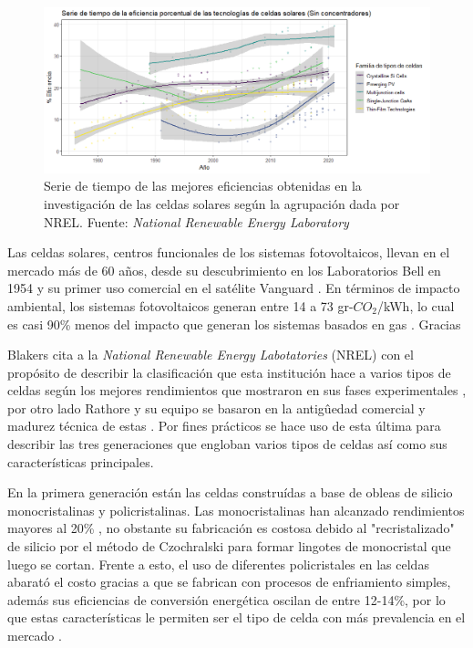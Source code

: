 \begin{figure}[h!]
    \includegraphics[scale=0.6]{img/SerieTiempo.png}
    \caption{Serie de tiempo de las mejores eficiencias obtenidas en la investigación de las celdas solares según la agrupación dada por NREL.
    Fuente: \textit{National Renewable Energy Laboratory} \cite{owidenergy}}
\end{figure}

Las celdas solares, centros funcionales de los sistemas fotovoltaicos, llevan en el mercado más de 60 años, desde su descubrimiento en los  Laboratorios Bell en 1954 \cite{green2009path} y su primer uso comercial en el satélite Vanguard \cite{singh2013solar}. En términos de impacto ambiental, los sistemas fotovoltaicos generan entre 14 a 73 gr-$CO_2$/kWh, lo cual es casi 90\% menos del impacto que generan los sistemas basados en gas \cite{tawalbeh2021environmental}. Gracias 

Blakers cita a la 
\textit{National Renewable Energy Labotatories} (NREL) con el propósito de describir la clasificación que esta institución hace a varios tipos de celdas  según los mejores rendimientos que mostraron en sus fases experimentales \cite{blakers2013}, por otro lado Rathore y su equipo se basaron en la antigûedad comercial y madurez técnica de estas \cite{rathore2021}. Por fines prácticos se hace uso de esta última para describir las tres generaciones que engloban varios tipos de celdas así como sus características principales. 

En la primera generación están las celdas construídas a base de obleas de silicio monocristalinas y policristalinas. Las monocristalinas han alcanzado rendimientos mayores al 20\% \cite{gul2016}, no obstante su fabricación es costosa  \cite{srinivas2015review} debido al "recristalizado" de silicio por el método de Czochralski \cite{yu2019growth} para formar lingotes de monocristal que luego se cortan. Frente a esto, el uso de diferentes policristales en las celdas abarató el costo gracias a que se fabrican con procesos de enfriamiento simples, además sus eficiencias de conversión energética oscilan de entre 12-14\%, por lo que estas características le permiten ser el tipo de celda con más prevalencia en el mercado \cite{sharma2015solar}. 

